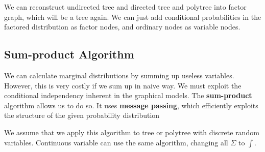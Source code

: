 \documentclass{article}
\begin{document}
        We can reconstruct undirected tree and directed tree and polytree into factor graph, which will be a tree again.
        We can just add conditional probabilities in the factored distribution as factor nodes,
        and ordinary nodes as variable nodes.


    \subsection{Sum-product Algorithm}
        We can calculate marginal distributions by summing up useless variables. However, this is very costly if we
        sum up in naive way. We must exploit the conditional independency inherent in the graphical models.
        The \textbf{sum-product} algorithm allows us to do so. It uses \textbf{message passing}, which efficiently exploits the structure of the given probability distribution

        We assume that we apply this algorithm to tree or polytree with discrete random variables.
        Continuous variable can use the same algorithm, changing all $\Sigma$ to $\int$.
\end{document}
